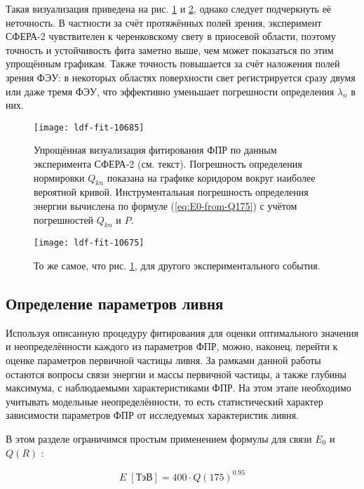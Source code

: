 Такая визуализация приведена на рис. \ref{pic:ldf-fit-example-1} и \ref{pic:ldf-fit-example-2}, однако следует подчеркнуть её неточность. В частности за счёт протяжённых полей зрения, эксперимент СФЕРА-2 чувствителен к черенковскому свету в приосевой области, поэтому точность и устойчивость фита заметно выше, чем может показаться по этим упрощённым графикам. Также точность повышается за счёт наложения полей зрения ФЭУ: в некоторых областях поверхности свет регистрируется сразу двумя или даже тремя ФЭУ, что эффективно уменьшает погрешности определения $\lambda_n$ в них.


\begin{figure}
	\centering
	\texttt{[image: ldf-fit-10685]}
	\caption{Упрощённая визуализация фитирования ФПР по данным эксперимента СФЕРА-2 (см. текст). Погрешность определения нормировки $Q_{kn}$ показана на графике коридором вокруг наиболее вероятной кривой. Инструментальная погрешность определения энергии вычислена по формуле (\ref{eq:E0-from-Q175}) с учётом погрешностей $Q_{kn}$ и $P$.}
	\label{pic:ldf-fit-example-1}
\end{figure}

\begin{figure}
	\centering
	\texttt{[image: ldf-fit-10675]}
	\caption{То же самое, что рис. \ref{pic:ldf-fit-example-1}, для другого экспериментального события.}
	\label{pic:ldf-fit-example-2}
\end{figure}


\subsection{Определение параметров ливня}

Используя описанную процедуру фитирования для оценки оптимального значения и неопределённости каждого из параметров ФПР, можно, наконец, перейти к оценке параметров первичной частицы ливня. За рамками данной работы остаются вопросы связи энергии и массы первичной частицы, а также глубины максимума, с наблюдаемыми характеристиками ФПР. На этом этапе необходимо учитывать модельные неопределённости, то есть статистический характер зависимости параметров ФПР от исследуемых характеристик ливня.

В этом разделе ограничимся простым применением формулы для связи $E_0$ и $Q(R)$ \cite{Budnev2005}:

\begin{equation}
	\label{eq:E0-from-Q175}
	E \; [\text{ТэВ}] = 400 \cdot Q(175)^{0.95}
\end{equation}

